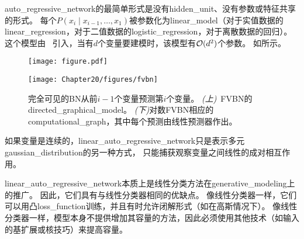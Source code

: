 \gls{auto_regressive_network}的最简单形式是没有\gls{hidden_unit}、没有参数或特征共享的形式。
每个$P(x_i \mid x_{i-1},\dots, x_1)$被参数化为\gls{linear_model}（对于实值数据的\gls{linear_regression}，对于二值数据的\gls{logistic_regression}，对于离散数据的回归）。
这个模型由~\citet{Frey98} 引入，当有$d$个变量要建模时，该模型有$\mathcal{O}(d^2)$个参数。
如所示。

\begin{figure}[!htb]
\ifOpenSource
\centerline{\texttt{[image: figure.pdf]}}
\else
\centerline{\texttt{[image: Chapter20/figures/fvbn]}}
\fi
\caption{完全可见的\gls{BN}从前$i-1$个变量预测第$i$个变量。
\emph{(上)}~FVBN的\gls{directed_graphical_model}。
\emph{(下)}对数FVBN相应的\gls{computational_graph}，其中每个预测由线性预测器作出。
}
\label{fig:chap20_fvbn}
\end{figure}

如果变量是连续的，\gls{linear_auto_regressive_network}只是表示多元\gls{gaussian_distribution}的另一种方式， 只能捕获观察变量之间线性的成对相互作用。
 
\gls{linear_auto_regressive_network}本质上是线性分类方法在\gls{generative_modeling}上的推广。
因此，它们具有与线性分类器相同的优缺点。
像线性分类器一样，它们可以用凸\gls{loss_function}训练，并且有时允许闭解形式（如在高斯情况下）。
像线性分类器一样，模型本身不提供增加其容量的方法，因此必须使用其他技术（如输入的基扩展或核技巧）来提高容量。


\subsection{}
\label{sec:neural_auto_regressive_networks}

